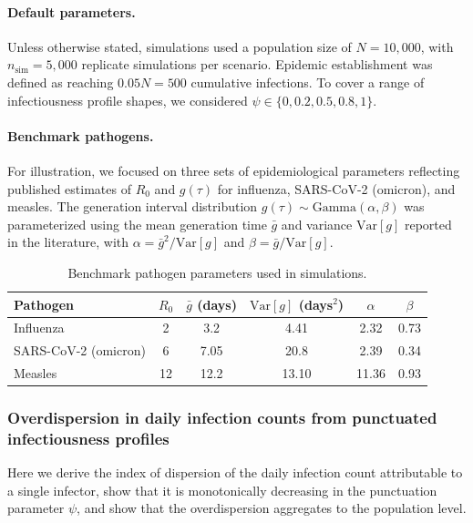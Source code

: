 \paragraph{Default parameters.}
Unless otherwise stated, simulations used a population size of $N = 10{,}000$, with $n_{\text{sim}} = 5{,}000$ replicate simulations per scenario. Epidemic establishment was defined as reaching $0.05 N = 500$ cumulative infections. To cover a range of infectiousness profile shapes, we considered $\psi \in \{0, 0.2, 0.5, 0.8, 1\}$.

\paragraph{Benchmark pathogens.}
For illustration, we focused on three sets of epidemiological parameters reflecting published estimates of $R_0$ and $g(\tau)$ for influenza, SARS-CoV-2 (omicron), and measles. The generation interval distribution $g(\tau) \sim \text{Gamma}(\alpha, \beta)$ was parameterized using the mean generation time $\bar{g}$ and variance $\text{Var}[g]$ reported in the literature, with $\alpha = \bar{g}^2 / \text{Var}[g]$ and $\beta = \bar{g} / \text{Var}[g]$.

\begin{table}[h]
\centering
\begin{tabular}{lccccc}
\hline
Pathogen & $R_0$ & $\bar{g}$ (days) & $\text{Var}[g]$ (days$^2$) & $\alpha$ & $\beta$ \\
\hline
Influenza & 2 & 3.2 & 4.41 & 2.32 & 0.73 \\
SARS-CoV-2 (omicron) & 6 & 7.05 & 20.8 & 2.39 & 0.34 \\
Measles & 12 & 12.2 & 13.10 & 11.36 & 0.93 \\
\hline
\end{tabular}
\caption{Benchmark pathogen parameters used in simulations.}
\label{tab:benchmark_pathogens}
\end{table}



\clearpage
\subsubsection{Overdispersion in daily infection counts from punctuated infectiousness profiles}
\label{sec:supp_daily_overdispersion}

Here we derive the index of dispersion of the daily infection count attributable to a single infector, show that it is monotonically decreasing in the punctuation parameter $\psi$, and show that the overdispersion aggregates to the population level.

